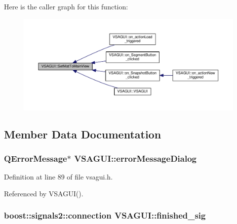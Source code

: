 Here is the caller graph for this function\+:\nopagebreak
\begin{figure}[H]
\begin{center}
\leavevmode
\includegraphics[width=350pt]{class_v_s_a_g_u_i_a988508cf880e27fcd8a029b94e546bcc_icgraph}
\end{center}
\end{figure}




\subsection{Member Data Documentation}
\hypertarget{class_v_s_a_g_u_i_af01408e987e5df2ce336ee8447841c1f}{}
\subsubsection[{error\+Message\+Dialog}]{\setlength{\rightskip}{0pt plus 5cm}Q\+Error\+Message$\ast$ V\+S\+A\+G\+U\+I\+::error\+Message\+Dialog\hspace{0.3cm}{\ttfamily [private]}}\label{class_v_s_a_g_u_i_af01408e987e5df2ce336ee8447841c1f}


Definition at line 89 of file vsagui.\+h.



Referenced by V\+S\+A\+G\+U\+I().

\hypertarget{class_v_s_a_g_u_i_a670325c6bab3874937f0a9b7e8e3b370}{}
\subsubsection[{finished\+\_\+sig}]{\setlength{\rightskip}{0pt plus 5cm}boost\+::signals2\+::connection V\+S\+A\+G\+U\+I\+::finished\+\_\+sig\hspace{0.3cm}{\ttfamily [private]}}\label{class_v_s_a_g_u_i_a670325c6bab3874937f0a9b7e8e3b370}


